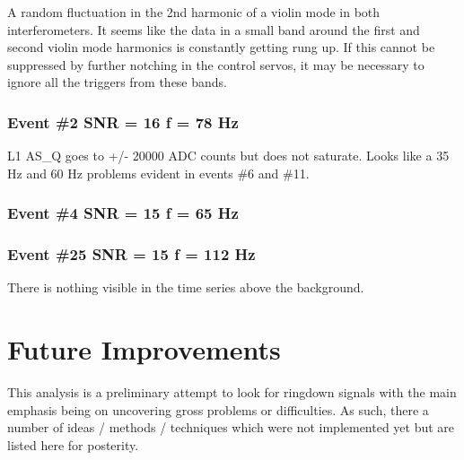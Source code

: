 A random fluctuation in the 2nd harmonic of a violin mode in both interferometers.
It seems like the data in a small band around the first and second violin mode
harmonics is constantly getting rung up. If this cannot be suppressed by
further notching in the control servos, it may be necessary to ignore all the
triggers from these bands.


\subsubsection{Event \#2   SNR = 16   f = 78 Hz}

L1 AS\_Q goes to +/- 20000 ADC counts but does not saturate. Looks like a
35 Hz and 60 Hz problems evident in events \#6 and \#11.


\subsubsection{Event \#4   SNR = 15   f = 65 Hz}


\subsubsection{Event \#25   SNR = 15   f = 112 Hz}

There is nothing visible in the time series above the background.



\section{Future Improvements}

This analysis is a preliminary attempt to look for ringdown signals with the
main emphasis being on uncovering gross problems or difficulties. As such,
there a number of ideas / methods / techniques which were not implemented
yet but are listed here for posterity.

